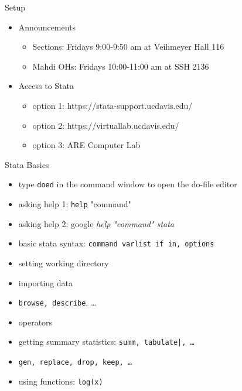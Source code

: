 \documentclass{beamer}
\begin{document}
\begin{frame}{Setup}
\begin{itemize}
\item Announcements
\begin{itemize}
\item Sections: Fridays 9:00-9:50 am at Veihmeyer Hall 116
\item Mahdi OHs: Fridays 10:00-11:00 am at SSH 2136  
\end{itemize}
\item Access to Stata
\begin{itemize}
\item option 1: https://stata-support.ucdavis.edu/
\item option 2: https://virtuallab.ucdavis.edu/
\item option 3: ARE Computer Lab
\end{itemize}

\end{itemize}
\end{frame}

\begin{frame}{Stata Basics}

\begin{itemize}
\item type \texttt{doed} in the command window to open the do-file editor
\item asking help 1: \texttt{help} "command"
\item asking help 2: google \emph{help "command" stata}
\item basic stata syntax: \texttt{command varlist if in, options}
\end{itemize}
        
\begin{itemize}
\item setting working directory
\item importing data
\item \texttt{browse, describe}, \dots
\item operators
\item getting summary statistics: \texttt{summ, tabulate|, \dots}
\item \texttt{gen, replace, drop, keep, \dots}
\item using functions: \texttt{log(x)}
\end{itemize}

\end{frame}
\end{document}

